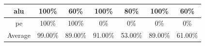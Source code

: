 \begin{tabular}{c|cc|cc|cc}
alu & \color{black} {\cellcolor{lightblue}} 100\% & 60\% & \color{black} {\cellcolor{lightblue}} 100\% & \color{black} {\cellcolor{lightgreen}} 80\% & \color{black} {\cellcolor{lightblue}} 100\% & 60\% \\ \midrule
pe & \color{black} {\cellcolor{lightblue}} 100\% & \color{black} {\cellcolor{lightgreen}} 100\% & 0\% & 0\% & 0\% & 0\% \\ \midrule
Average & \color{black} {\cellcolor{lightblue}} 99.00\% & \color{black} {\cellcolor{lightgreen}} 89.00\% & 91.00\% & 53.00\% & 89.00\% & 61.00\% \\
\bottomrule
\end{tabular}
